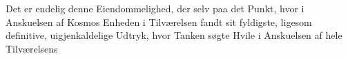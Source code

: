 \documentclass[12pt,a4paper]{book}
\newcommand{\divrule}{\begin{center}\rule{2cm}{0.4pt}\end{center}}
\newcommand{\gk}[1]{\textit{#1}}
\begin{document}
Det er endelig denne Eiendommelighed, der selv paa det
Punkt, hvor i Anskuelsen af Kosmos Enheden i Tilværelsen
fandt sit fyldigste, ligesom definitive, uigjenkaldelige Udtryk,
hvor Tanken søgte Hvile i Anskuelsen af hele Tilværelsens
\end{document}
